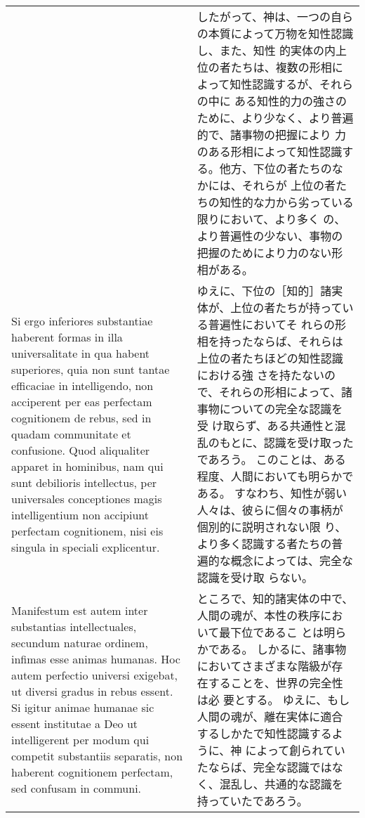 \documentclass[10pt]{jsarticle} %
\begin{document}
\begin{longtable}{p{21em}p{21em}}
& したがって、神は、一つの自らの本質によって万物を知性認識し、また、知性
的実体の内上位の者たちは、複数の形相によって知性認識するが、それらの中に
ある知性的力の強さのために、より少なく、より普遍的で、諸事物の把握により
力のある形相によって知性認識する。他方、下位の者たちのなかには、それらが
 上位の者たちの知性的な力から劣っている限りにおいて、より多く
 の、より普遍性の少ない、事物の把握のためにより力のない形相がある。

\\



 Si ergo inferiores substantiae haberent formas in illa
 universalitate in qua habent superiores, quia non sunt tantae
 efficaciae in intelligendo, non acciperent per eas perfectam
 cognitionem de rebus, sed in quadam communitate et confusione. Quod
 aliqualiter apparet in hominibus, nam qui sunt debilioris intellectus,
 per universales conceptiones magis intelligentium non accipiunt
 perfectam cognitionem, nisi eis singula in speciali
 explicentur.


&

ゆえに、下位の［知的］諸実体が、上位の者たちが持っている普遍性においてそ
 れらの形相を持ったならば、それらは上位の者たちほどの知性認識における強
 さを持たないので、それらの形相によって、諸事物についての完全な認識を受
 け取らず、ある共通性と混乱のもとに、認識を受け取ったであろう。
このことは、ある程度、人間においても明らかである。
すなわち、知性が弱い人々は、彼らに個々の事柄が個別的に説明されない限
 り、より多く認識する者たちの普遍的な概念によっては、完全な認識を受け取
 らない。

\\


 Manifestum est autem inter substantias intellectuales,
 secundum naturae ordinem, infimas esse animas humanas. Hoc autem
 perfectio universi exigebat, ut diversi gradus in rebus essent. Si
 igitur animae humanae sic essent institutae a Deo ut intelligerent per
 modum qui competit substantiis separatis, non haberent cognitionem
 perfectam, sed confusam in communi.


&

ところで、知的諸実体の中で、人間の魂が、本性の秩序において最下位であるこ
 とは明らかである。
しかるに、諸事物においてさまざまな階級が存在することを、世界の完全性は必
 要とする。
ゆえに、もし人間の魂が、離在実体に適合するしかたで知性認識するように、神
 によって創られていたならば、完全な認識ではなく、混乱し、共通的な認識を
 持っていたであろう。

\\




\end{longtable}
\end{document}
